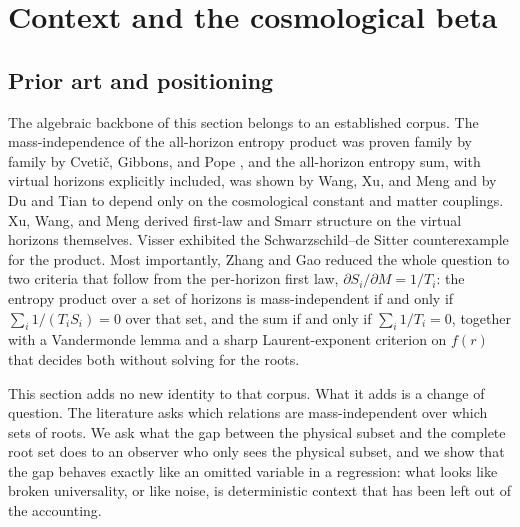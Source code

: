
\section{Context and the cosmological beta}
\label{sec:context}

\subsection{Prior art and positioning}

The algebraic backbone of this section belongs to an established corpus. The mass-independence of the all-horizon entropy product was proven family by family by Cveti\v{c}, Gibbons, and Pope \cite{CGP2011}, and the all-horizon entropy sum, with virtual horizons explicitly included, was shown by Wang, Xu, and Meng \cite{WXM2014} and by Du and Tian \cite{DuTian} to depend only on the cosmological constant and matter couplings. Xu, Wang, and Meng \cite{XWM2014} derived first-law and Smarr structure on the virtual horizons themselves. Visser \cite{Visser2013} exhibited the Schwarzschild--de Sitter counterexample for the product. Most importantly, Zhang and Gao \cite{ZhangGao} reduced the whole question to two criteria that follow from the per-horizon first law, $\partial S_i/\partial M = 1/T_i$: the entropy product over a set of horizons is mass-independent if and only if $\sum_i 1/(T_i S_i)=0$ over that set, and the sum if and only if $\sum_i 1/T_i = 0$, together with a Vandermonde lemma and a sharp Laurent-exponent criterion on $f(r)$ that decides both without solving for the roots.

This section adds no new identity to that corpus. What it adds is a change of question. The literature asks which relations are mass-independent over which sets of roots. We ask what the gap between the physical subset and the complete root set does to an observer who only sees the physical subset, and we show that the gap behaves exactly like an omitted variable in a regression: what looks like broken universality, or like noise, is deterministic context that has been left out of the accounting.


